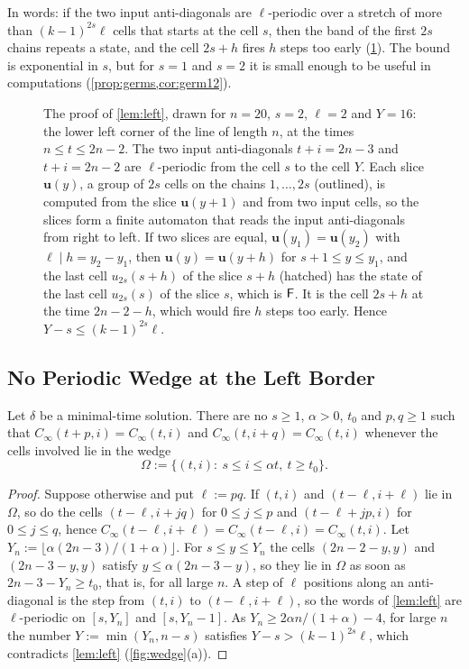 In words: if the two input anti-diagonals are $\ell$-periodic over a stretch
of more than $(k-1)^{2s}\ell$ cells that starts at the cell $s$, then the band
of the first $2s$ chains repeats a state, and the cell $2s+h$ fires $h$ steps
too early (\cref{fig:leftproof}). The bound is exponential in $s$, but for $s=1$ and $s=2$ it is small
enough to be useful in computations (\cref{prop:germs,cor:germ12}).

\begin{figure}[t]
\centering

\caption{The proof of \cref{lem:left}, drawn for $n=20$, $s=2$, $\ell=2$ and
$Y=16$: the lower left corner of the line of length $n$, at the times
$n\le t\le2n-2$. The two input anti-diagonals $t+i=2n-3$ and $t+i=2n-2$ are
$\ell$-periodic from the cell $s$ to the cell $Y$. Each slice $\mathbf u(y)$,
a group of $2s$ cells on the chains $1,\dots,2s$ (outlined), is computed from
the slice $\mathbf u(y+1)$ and from two input cells, so the slices form a
finite automaton that reads the input anti-diagonals from right to left. If two
slices are equal, $\mathbf u(y_1)=\mathbf u(y_2)$ with $\ell\mid
h=y_2-y_1$, then $\mathbf u(y)=\mathbf u(y+h)$ for $s+1\le y\le y_1$, and the
last cell $u_{2s}(s+h)$ of the slice $s+h$ (hatched) has the state of the last
cell $u_{2s}(s)$ of the slice $s$, which is $\mathsf F$. It is the cell $2s+h$ at
the time $2n-2-h$, which would fire $h$ steps too early. Hence $Y-s\le
(k-1)^{2s}\ell$.}
\label{fig:leftproof}
\end{figure}

\subsection{No Periodic Wedge at the Left Border}

\begin{theorem}\label{thm:left}
Let $\delta$ be a minimal-time solution. There are no $s\ge1$, $\alpha>0$,
$t_0$ and $p,q\ge1$ such that $C_\infty(t+p,i)=C_\infty(t,i)$ and
$C_\infty(t,i+q)=C_\infty(t,i)$ whenever the cells involved lie in the wedge
\[
\Omega:=\{(t,i):\ s\le i\le\alpha t,\ t\ge t_0\}.
\]
\end{theorem}

\begin{proof}
Suppose otherwise and put $\ell:=pq$. If $(t,i)$ and $(t-\ell,i+\ell)$ lie in
$\Omega$, so do the cells $(t-\ell,i+jq)$ for $0\le j\le p$ and $(t-\ell+jp,i)$
for $0\le j\le q$, hence
$C_\infty(t-\ell,i+\ell)=C_\infty(t-\ell,i)=C_\infty(t,i)$. Let
$Y_n:=\lfloor\alpha(2n-3)/(1+\alpha)\rfloor$. For $s\le y\le Y_n$ the cells
$(2n-2-y,y)$ and $(2n-3-y,y)$ satisfy $y\le\alpha(2n-3-y)$, so they lie in
$\Omega$ as soon as $2n-3-Y_n\ge t_0$, that is, for all large $n$. A step of
$\ell$ positions along an anti-diagonal is the step from $(t,i)$ to
$(t-\ell,i+\ell)$, so the words of \cref{lem:left} are $\ell$-periodic on
$[s,Y_n]$ and $[s,Y_n-1]$. As $Y_n\ge2\alpha n/(1+\alpha)-4$, for large
$n$ the number $Y:=\min(Y_n,n-s)$ satisfies $Y-s>(k-1)^{2s}\ell$, which
contradicts \cref{lem:left} (\cref{fig:wedge}(a)).
\end{proof}

